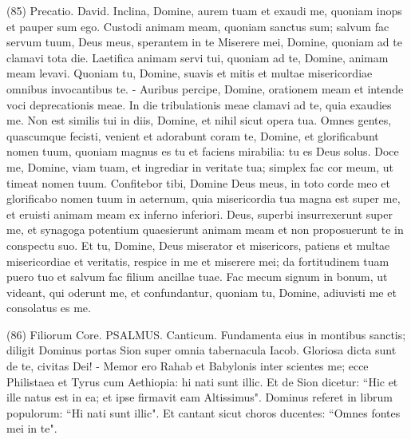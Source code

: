 \begin{biblechapter}  (85) 
\verse  Precatio. David. Inclina, Domine, aurem tuam et exaudi me, quoniam inops et pauper sum ego. 
\verse Custodi animam meam, quoniam sanctus sum; salvum fac servum tuum, Deus meus, sperantem in te 
\verse Miserere mei, Domine, quoniam ad te clamavi tota die. 
\verse Laetifica animam servi tui, quoniam ad te, Domine, animam meam levavi. 
\verse Quoniam tu, Domine, suavis et mitis et multae misericordiae omnibus invocantibus te. - 
\verse Auribus percipe, Domine, orationem meam et intende voci deprecationis meae. 
\verse In die tribulationis meae clamavi ad te, quia exaudies me. 
\verse Non est similis tui in diis, Domine, et nihil sicut opera tua. 
\verse Omnes gentes, quascumque fecisti, venient et adorabunt coram te, Domine, et glorificabunt nomen tuum, 
\verse quoniam magnus es tu et faciens mirabilia: tu es Deus solus. 
\verse Doce me, Domine, viam tuam, et ingrediar in veritate tua; simplex fac cor meum, ut timeat nomen tuum. 
\verse Confitebor tibi, Domine Deus meus, in toto corde meo et glorificabo nomen tuum in aeternum, 
\verse quia misericordia tua magna est super me, et eruisti animam meam ex inferno inferiori. 
\verse Deus, superbi insurrexerunt super me, et synagoga potentium quaesierunt animam meam et non proposuerunt te in conspectu suo. 
\verse Et tu, Domine, Deus miserator et misericors, patiens et multae misericordiae et veritatis, 
\verse respice in me et miserere mei; da fortitudinem tuam puero tuo et salvum fac filium ancillae tuae. 
\verse Fac mecum signum in bonum, ut videant, qui oderunt me, et confundantur, quoniam tu, Domine, adiuvisti me et consolatus es me. 
\end{biblechapter}

\begin{biblechapter}  (86) 
\verse  Filiorum Core. PSALMUS. Canticum. Fundamenta eius in montibus sanctis; 
\verse diligit Dominus portas Sion super omnia tabernacula Iacob. 
\verse Gloriosa dicta sunt de te, civitas Dei! - 
\verse Memor ero Rahab et Babylonis inter scientes me; ecce Philistaea et Tyrus cum Aethiopia: hi nati sunt illic. 
\verse Et de Sion dicetur: “Hic et ille natus est in ea; et ipse firmavit eam Altissimus". 
\verse Dominus referet in librum populorum: “Hi nati sunt illic". 
\verse Et cantant sicut choros ducentes: “Omnes fontes mei in te". 
\end{biblechapter}

